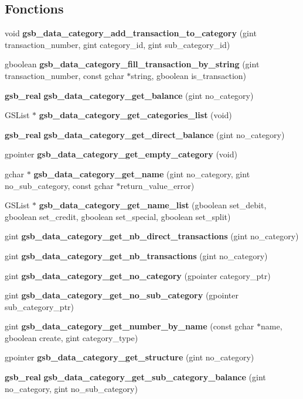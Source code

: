 \subsection*{Fonctions}
\begin{DoxyCompactItemize}
\item 
void {\bf gsb\_\-data\_\-category\_\-add\_\-transaction\_\-to\_\-category} (gint transaction\_\-number, gint category\_\-id, gint sub\_\-category\_\-id)
\item 
gboolean {\bf gsb\_\-data\_\-category\_\-fill\_\-transaction\_\-by\_\-string} (gint transaction\_\-number, const gchar $\ast$string, gboolean is\_\-transaction)
\item 
{\bf gsb\_\-real} {\bf gsb\_\-data\_\-category\_\-get\_\-balance} (gint no\_\-category)
\item 
GSList $\ast$ {\bf gsb\_\-data\_\-category\_\-get\_\-categories\_\-list} (void)
\item 
{\bf gsb\_\-real} {\bf gsb\_\-data\_\-category\_\-get\_\-direct\_\-balance} (gint no\_\-category)
\item 
gpointer {\bf gsb\_\-data\_\-category\_\-get\_\-empty\_\-category} (void)
\item 
gchar $\ast$ {\bf gsb\_\-data\_\-category\_\-get\_\-name} (gint no\_\-category, gint no\_\-sub\_\-category, const gchar $\ast$return\_\-value\_\-error)
\item 
GSList $\ast$ {\bf gsb\_\-data\_\-category\_\-get\_\-name\_\-list} (gboolean set\_\-debit, gboolean set\_\-credit, gboolean set\_\-special, gboolean set\_\-split)
\item 
gint {\bf gsb\_\-data\_\-category\_\-get\_\-nb\_\-direct\_\-transactions} (gint no\_\-category)
\item 
gint {\bf gsb\_\-data\_\-category\_\-get\_\-nb\_\-transactions} (gint no\_\-category)
\item 
gint {\bf gsb\_\-data\_\-category\_\-get\_\-no\_\-category} (gpointer category\_\-ptr)
\item 
gint {\bf gsb\_\-data\_\-category\_\-get\_\-no\_\-sub\_\-category} (gpointer sub\_\-category\_\-ptr)
\item 
gint {\bf gsb\_\-data\_\-category\_\-get\_\-number\_\-by\_\-name} (const gchar $\ast$name, gboolean create, gint category\_\-type)
\item 
gpointer {\bf gsb\_\-data\_\-category\_\-get\_\-structure} (gint no\_\-category)
\item 
{\bf gsb\_\-real} {\bf gsb\_\-data\_\-category\_\-get\_\-sub\_\-category\_\-balance} (gint no\_\-category, gint no\_\-sub\_\-category)

\end{DoxyCompactItemize}
